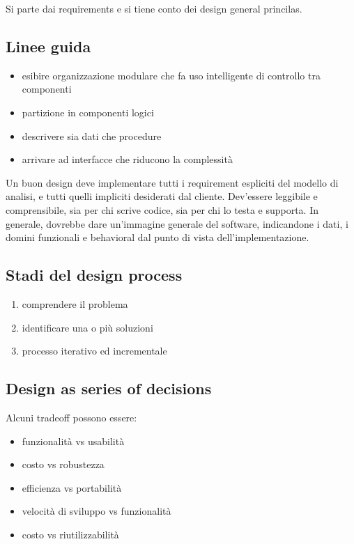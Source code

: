 \documentclass{article}
\begin{document}
Si parte dai requirements e si tiene conto dei design general princilas.

\subsection{Linee guida}
\begin{itemize}
    \item esibire organizzazione modulare che fa uso intelligente di controllo tra componenti
    \item partizione in componenti logici
    \item descrivere sia dati che procedure
    \item arrivare ad interfacce che riducono la complessità
\end{itemize}

Un buon design deve implementare tutti i requirement espliciti del modello di analisi, e tutti quelli impliciti
desiderati dal cliente. Dev'essere leggibile e comprensibile, sia per chi scrive codice, sia per chi lo testa
e supporta. In generale, dovrebbe dare un'immagine generale del software, indicandone i dati, i domini
funzionali e behavioral dal punto di vista dell'implementazione.



\subsection{Stadi del design process}
\begin{enumerate}
    \item comprendere il problema
    \item identificare una o più soluzioni
    \item processo iterativo ed incrementale
\end{enumerate}

\subsection{Design as series of decisions}
Alcuni tradeoff possono essere:
\begin{itemize}
    \item funzionalità vs usabilità
    \item costo vs robustezza
    \item efficienza vs portabilità
    \item velocità di sviluppo vs funzionalità
    \item costo vs riutilizzabilità
\end{itemize}
\end{document}
